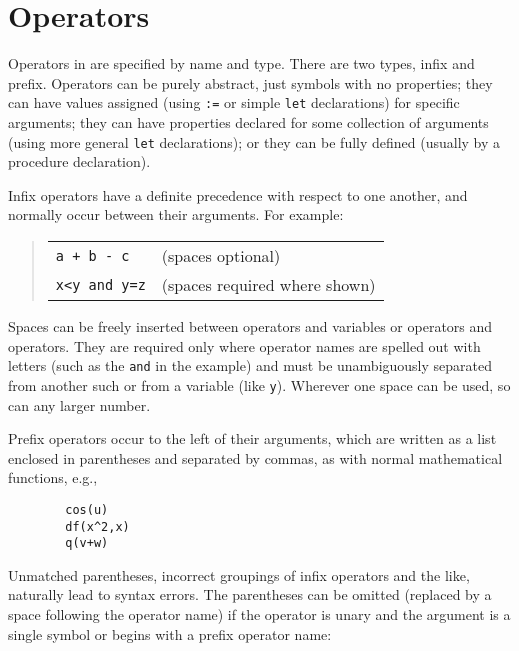 \section{Operators}
\label{sec-operators}

Operators in {\REDUCE} are specified by name and type.
There are two types, infix and prefix.
  Operators can be purely abstract, just symbols
with no properties; they can have values assigned (using \texttt{:=} or
simple \texttt{let} declarations) for specific arguments; they can have
properties declared for some collection of arguments (using more general
\texttt{let} declarations); or they can be fully defined (usually by a
procedure declaration).

Infix operators have a definite precedence with
respect to one another, and normally occur between their arguments.
For example:
\begin{quote}
\begin{tabular}{p{4cm}l}
\texttt{a + b - c} & (spaces optional) \\
\texttt{x<y and y=z} & (spaces required where shown)
\end{tabular}
\end{quote}
Spaces can be freely inserted between operators and variables or operators
and operators. They are required only where operator names are spelled out
with letters (such as the \texttt{and} in the example) and must be unambiguously
separated from another such or from a variable (like \texttt{y}). Wherever one
space can be used, so can any larger number.

Prefix operators occur to the left of their arguments, which are written as
a list enclosed in parentheses and separated by commas, as with normal
mathematical functions, e.g.,
\begin{verbatim}
        cos(u)
        df(x^2,x)
        q(v+w)
\end{verbatim}
Unmatched parentheses, incorrect groupings of infix operators
 and the like, naturally lead to syntax errors.  The
parentheses can be omitted (replaced by a space following the
operator name) if the operator is unary and the argument
is a single symbol or begins with a prefix operator name:

